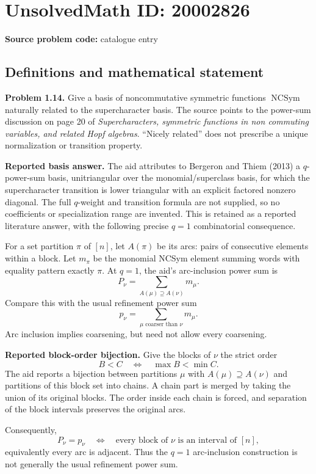 \documentclass[11pt]{article}
\begin{document}
\section*{UnsolvedMath ID: 20002826}
\textbf{Source problem code:} catalogue entry
\subsection{Definitions and mathematical statement}
\textbf{Problem 1.14.} Give a basis of noncommutative symmetric functions \(\operatorname{NCSym}\) naturally related to the supercharacter basis. The source points to the power-sum discussion on page 20 of \emph{Supercharacters, symmetric functions in non commuting variables, and related Hopf algebras}. ``Nicely related'' does not prescribe a unique normalization or transition property.

\textbf{Reported basis answer.} The aid attributes to Bergeron and Thiem (2013) a \(q\)-power-sum basis, unitriangular over the monomial/superclass basis, for which the supercharacter transition is lower triangular with an explicit factored nonzero diagonal. The full \(q\)-weight and transition formula are not supplied, so no coefficients or specialization range are invented. This is retained as a reported literature answer, with the following precise \(q=1\) combinatorial consequence.

For a set partition \(\pi\) of \([n]\), let \(A(\pi)\) be its arcs: pairs of consecutive elements within a block. Let \(m_\pi\) be the monomial NCSym element summing words with equality pattern exactly \(\pi\). At \(q=1\), the aid's arc-inclusion power sum is
\[
 P_\nu=\sum_{A(\mu)\supseteq A(\nu)}m_\mu.
\]
Compare this with the usual refinement power sum
\[
 p_\nu=\sum_{\mu\text{ coarser than }\nu}m_\mu.
\]
Arc inclusion implies coarsening, but need not allow every coarsening.

\textbf{Reported block-order bijection.} Give the blocks of \(\nu\) the strict order
\[
 B<C\quad\Longleftrightarrow\quad\max B<\min C.
\]
The aid reports a bijection between partitions \(\mu\) with \(A(\mu)\supseteq A(\nu)\) and partitions of this block set into chains. A chain part is merged by taking the union of its original blocks. The order inside each chain is forced, and separation of the block intervals preserves the original arcs.

Consequently,
\[
 P_\nu=p_\nu\quad\Longleftrightarrow\quad
 \text{every block of }\nu\text{ is an interval of }[n],
\]
equivalently every arc is adjacent. Thus the \(q=1\) arc-inclusion construction is not generally the usual refinement power sum.
\end{document}
